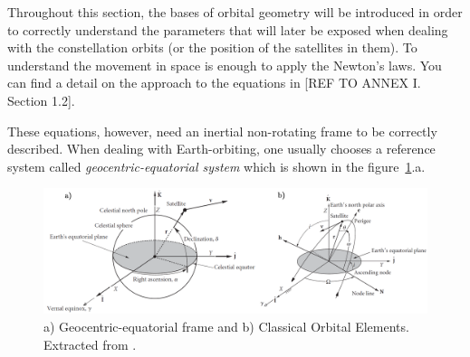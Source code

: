 Throughout this section, the bases of orbital geometry will be introduced in order to correctly understand the parameters that will later be exposed when dealing with the constellation orbits (or the position of the satellites in them). To understand the movement in space is enough to apply the Newton's laws. You can find a detail on the approach to the equations in [{REF TO ANNEX I. Section 1.2}].

These equations, however, need an inertial non-rotating frame to be correctly described. When dealing with Earth-orbiting, one usually chooses a reference system called \textit{geocentric-equatorial system} which is shown in the figure~\ref{fig:eqframe}.a. 

\begin{figure}[H]
\centering
\includegraphics[scale=.28]{./Geometry/fig-Ch1-Geometry/COE&eqframe.png}
\caption[a) Geocentric-equatorial frame and b) Classical Orbital Elements]{a) Geocentric-equatorial frame and b) Classical Orbital Elements. Extracted from \cite{Howard}.}
\label{fig:eqframe}
\end{figure}


